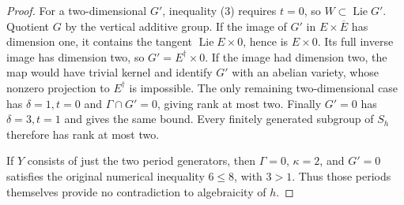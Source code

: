 \documentclass[11pt]{article}
\theoremstyle{definition}\newtheorem{definition}[theorem]{Definition}
\theoremstyle{remark}\newtheorem{remark}[theorem]{Remark}
\DeclareMathOperator{\Lie}{Lie}\DeclareMathOperator{\trdeg}{trdeg}
\begin{document}
\begin{proof}
For a two-dimensional $G'$, inequality (3) requires $t=0$, so $W\subset\Lie G'$. Quotient $G$ by the vertical additive group. If the image of $G'$ in $E\times\overline E$ has dimension one, it contains the tangent $\Lie E\times0$, hence is $E\times0$. Its full inverse image has dimension two, so $G'=E^\dagger\times0$. If the image had dimension two, the map would have trivial kernel and identify $G'$ with an abelian variety, whose nonzero projection to $E^\dagger$ is impossible. The only remaining two-dimensional case has $\delta=1,t=0$ and $\Gamma\cap G'=0$, giving rank at most two. Finally $G'=0$ has $\delta=3,t=1$ and gives the same bound. Every finitely generated subgroup of $S_h$ therefore has rank at most two.

If $Y$ consists of just the two period generators, then $\Gamma=0$, $\kappa=2$, and $G'=0$ satisfies the original numerical inequality $6\le8$, with $3>1$. Thus those periods themselves provide no contradiction to algebraicity of $h$.
\end{proof}
\end{document}
